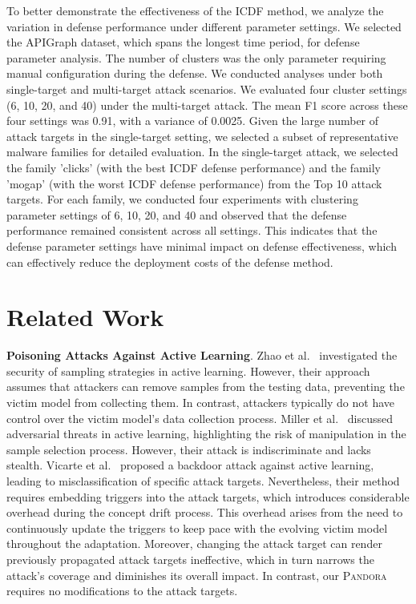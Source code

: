 \documentclass[lettersize,journal]{IEEEtran}
\newcommand{\pandora}{{\scshape Pandora}\xspace}
\begin{document}
To better demonstrate the effectiveness of the ICDF method, we analyze the variation in defense performance under different parameter settings.
We selected the APIGraph dataset, which spans the longest time period, for defense parameter analysis.
The number of clusters was the only parameter requiring manual configuration during the defense.
We conducted analyses under both single-target and multi-target attack scenarios.  
We evaluated four cluster settings (6, 10, 20, and 40) under the multi-target attack. 
The mean F1 score across these four settings was 0.91, with a variance of 0.0025.
Given the large number of attack targets in the single-target setting, we selected a subset of representative malware families for detailed evaluation.
In the single-target attack, we selected the family 'clicks' (with the best ICDF defense performance) and the family 'mogap' (with the worst ICDF defense performance) from the Top 10 attack targets.
For each family, we conducted four experiments with clustering parameter settings of 6, 10, 20, and 40 and observed that the defense performance remained consistent across all settings.
This indicates that the defense parameter settings have minimal impact on defense effectiveness, which can effectively reduce the deployment costs of the defense method.

\section{Related Work}
\label{sec: Related work}
\textbf{Poisoning Attacks Against Active Learning}.
Zhao et al.~\cite{zhao2012sampling} investigated the security of sampling strategies in active learning. 
However, their approach assumes that attackers can remove samples from the testing data, preventing the victim model from collecting them. 
In contrast, attackers typically do not have control over the victim model’s data collection process.
Miller et al.~\cite{miller2014adversarial} discussed adversarial threats in active learning, highlighting the risk of manipulation in the sample selection process. However, their attack is indiscriminate and lacks stealth.
Vicarte et al.~\cite{2021-Usenix-active-learning-backdoor} proposed a backdoor attack against active learning, leading to misclassification of specific attack targets.
Nevertheless, their method requires embedding triggers into the attack targets, which introduces considerable overhead during the concept drift process.
This overhead arises from the need to continuously update the triggers to keep pace with the evolving victim model throughout the adaptation.
Moreover, changing the attack target can render previously propagated attack targets ineffective, which in turn narrows the attack’s coverage and diminishes its overall impact.
In contrast, our \pandora requires no modifications to the attack targets.
\end{document}
